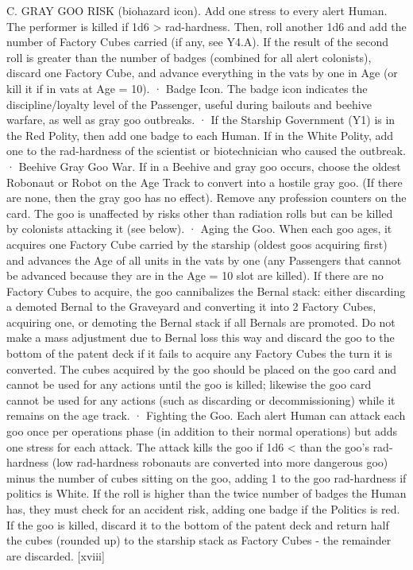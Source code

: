 \documentclass[a4paper]{book}
\begin{document}
C. GRAY GOO RISK (biohazard icon). Add one stress to every alert Human. The performer is killed if 1d6 > rad-hardness. Then, roll another 1d6 and add the number of Factory Cubes carried (if any, see Y4.A). If the result of the second roll is greater than the number of badges (combined for all alert colonists), discard one Factory Cube, and advance everything in the vats by one in Age (or kill it if in vats at Age = 10).
·       Badge Icon. The badge icon indicates the discipline/loyalty level of the Passenger, useful during bailouts and beehive warfare, as well as gray goo outbreaks.
·       If the Starship Government (Y1) is in the Red Polity, then add one badge to each Human. If in the White Polity, add one to the rad-hardness of the scientist or biotechnician who caused the outbreak.
·       Beehive Gray Goo War. If in a Beehive and gray goo occurs, choose the oldest Robonaut or Robot on the Age Track to convert into a hostile gray goo. (If there are none, then the gray goo has no effect). Remove any profession counters on the card. The goo is unaffected by risks other than radiation rolls but can be killed by colonists attacking it (see below).
·       Aging the Goo. When each goo ages, it acquires one Factory Cube carried by the starship (oldest goos acquiring first) and advances the Age of all units in the vats by one (any Passengers that cannot be advanced because they are in the Age = 10 slot are killed). If there are no Factory Cubes to acquire, the goo cannibalizes the Bernal stack: either discarding a demoted Bernal to the Graveyard and converting it into 2 Factory Cubes, acquiring one, or demoting the Bernal stack if all Bernals are promoted.  Do not make a mass adjustment due to Bernal loss this way and discard the goo to the bottom of the patent deck if it fails to acquire any Factory Cubes the turn it is converted. The cubes acquired by the goo should be placed on the goo card and cannot be used for any actions until the goo is killed; likewise the goo card cannot be used for any actions (such as discarding or decommissioning) while it remains on the age track.
·       Fighting the Goo. Each alert Human can attack each goo once per operations phase (in addition to their normal operations) but adds one stress for each attack. The attack kills the goo if 1d6 < than the goo’s rad-hardness (low rad-hardness robonauts are converted into more dangerous goo) minus the number of cubes sitting on the goo, adding 1 to the goo rad-hardness if politics is White. If the roll is higher than the twice number of badges the Human has, they must check for an accident risk, adding one badge if the Politics is red. If the goo is killed, discard it to the bottom of the patent deck and return half the cubes (rounded up) to the starship stack as Factory Cubes - the remainder are discarded.  [xviii]
\end{document}
